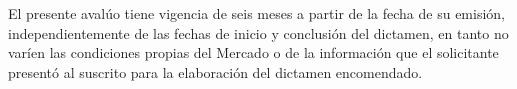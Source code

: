 %

El presente aval\'uo tiene vigencia de \textcolor{principal}{seis meses} a partir de la fecha de su emisi\'on, independientemente de las fechas de inicio y conclusi\'on del dictamen, en tanto no var\'ien las condiciones propias del Mercado o de la informaci\'on que el solicitante present\'o al suscrito para la elaboración del dictamen encomendado.

